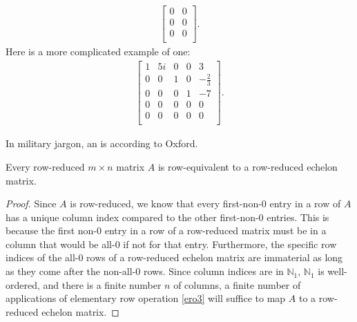 \documentclass[12pt]{article}
\begin{document}
\begin{defn}
\begin{exm}
\begin{align*}
      \begin{bmatrix}
        0 & 0\\
        0 & 0\\
        0 & 0\\
      \end{bmatrix}.
    \end{align*}
    Here is a more complicated example of one:
    \begin{align*}
      \begin{bmatrix}
        1 & 5i & 0 & 0 & 3\\
        0 & 0  & 1 & 0 & -\frac{2}{3}\\
        0 & 0  & 0 & 1 & -7\\
        0 & 0  & 0 & 0 & 0\\
        0 & 0  & 0 & 0 & 0\\
      \end{bmatrix}.
    \end{align*}
  \end{exm}

  \begin{comm}
    In military jargon, an  is  according to Oxford.
  \end{comm}

\end{defn}

\begin{thm} \label{thm:rowredeqrowredech}
  Every row-reduced $m \times n$ matrix $A$ is row-equivalent to
  a row-reduced echelon matrix.
  \begin{proof}
    Since $A$ is row-reduced, we know that every first-non-0
    entry in a row of $A$ has a unique column index compared to
    the other first-non-0 entries. This is because the first
    non-0 entry in a row of a row-reduced matrix must be in a
    column that would be all-0 if not for that entry.
    Furthermore, the specific row indices of the all-0 rows of a
    row-reduced echelon matrix are immaterial as long as they
    come after the non-all-0 rows. Since column indices are in
    $\mathbb{N}_1$, $\mathbb{N}_1$ is well-ordered, and there is
    a finite number $n$ of columns, a finite number of
    applications of elementary row operation \eqref{ero3} will
    suffice to map $A$ to a row-reduced echelon matrix.
  \end{proof}
\end{thm}
\end{document}
